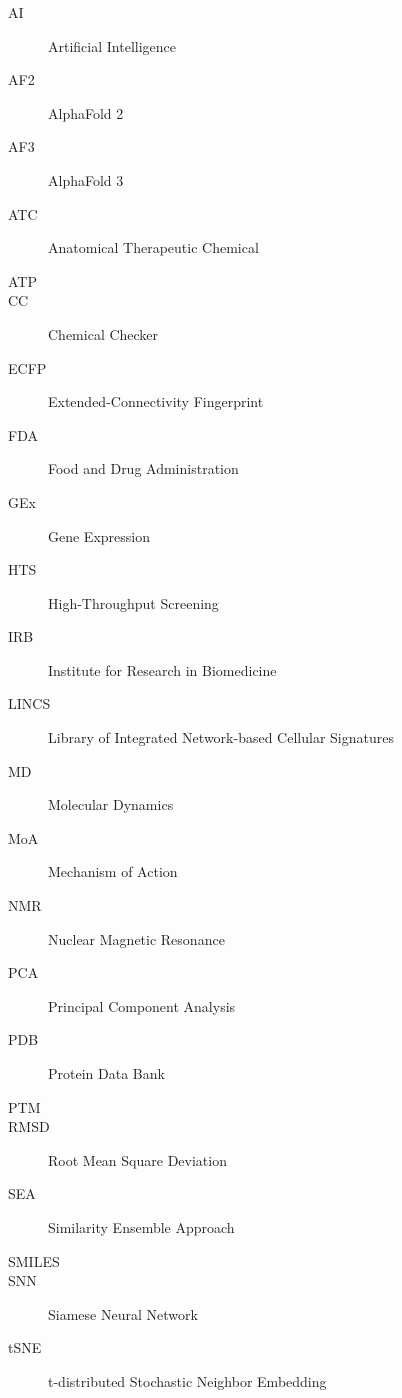 

\begin{description}
    \item[AI] Artificial Intelligence
    \item[AF2] AlphaFold 2
    \item[AF3] AlphaFold 3
    \item[ATC] Anatomical Therapeutic Chemical
    \item[ATP] 
    \item[CC] Chemical Checker
    \item[ECFP] Extended-Connectivity Fingerprint
    \item[FDA] Food and Drug Administration
    \item[GEx] Gene Expression
    \item[HTS] High-Throughput Screening
    \item[IRB] Institute for Research in Biomedicine 
    \item[LINCS] Library of Integrated Network-based Cellular Signatures
    \item[MD] Molecular Dynamics
    \item[MoA] Mechanism of Action
    \item[NMR] Nuclear Magnetic Resonance
    \item[PCA] Principal Component Analysis
    \item[PDB] Protein Data Bank
    \item[PTM] 
    \item[RMSD] Root Mean Square Deviation
    \item[SEA] Similarity Ensemble Approach
    \item[SMILES] 
    \item[SNN] Siamese Neural Network
    \item[tSNE] t-distributed Stochastic Neighbor Embedding
\end{description}

